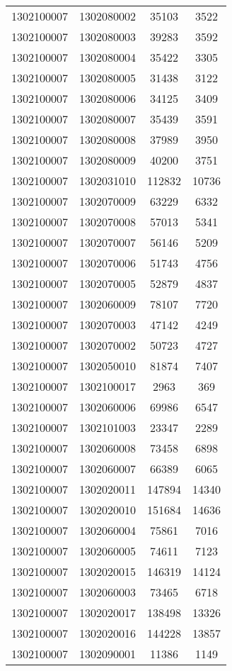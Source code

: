 \begin{longtable}[h]{llcc}
		1302100007 & 1302080002 & 35103 & 3522\\
		1302100007 & 1302080003 & 39283 & 3592\\
		1302100007 & 1302080004 & 35422 & 3305\\
		1302100007 & 1302080005 & 31438 & 3122\\
		1302100007 & 1302080006 & 34125 & 3409\\
		1302100007 & 1302080007 & 35439 & 3591\\
		1302100007 & 1302080008 & 37989 & 3950\\
		1302100007 & 1302080009 & 40200 & 3751\\
		1302100007 & 1302031010 & 112832 & 10736\\
		1302100007 & 1302070009 & 63229 & 6332\\
		1302100007 & 1302070008 & 57013 & 5341\\
		1302100007 & 1302070007 & 56146 & 5209\\
		1302100007 & 1302070006 & 51743 & 4756\\
		1302100007 & 1302070005 & 52879 & 4837\\
		1302100007 & 1302060009 & 78107 & 7720\\
		1302100007 & 1302070003 & 47142 & 4249\\
		1302100007 & 1302070002 & 50723 & 4727\\
		1302100007 & 1302050010 & 81874 & 7407\\
		1302100007 & 1302100017 & 2963 & 369\\
		1302100007 & 1302060006 & 69986 & 6547\\
		1302100007 & 1302101003 & 23347 & 2289\\
		1302100007 & 1302060008 & 73458 & 6898\\
		1302100007 & 1302060007 & 66389 & 6065\\
		1302100007 & 1302020011 & 147894 & 14340\\
		1302100007 & 1302020010 & 151684 & 14636\\
		1302100007 & 1302060004 & 75861 & 7016\\
		1302100007 & 1302060005 & 74611 & 7123\\
		1302100007 & 1302020015 & 146319 & 14124\\
		1302100007 & 1302060003 & 73465 & 6718\\
		1302100007 & 1302020017 & 138498 & 13326\\
		1302100007 & 1302020016 & 144228 & 13857\\
		1302100007 & 1302090001 & 11386 & 1149\\

\end{longtable}
